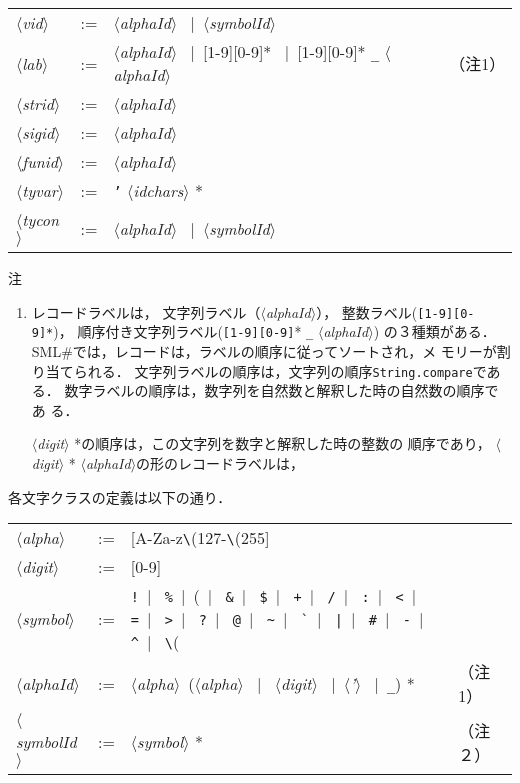 \documentclass{jbook}
\newcommand{\smlsharp}{SML\#}
\newcommand{\code}[1]{\mbox{\large\tt #1}}
\newcommand{\vbar}{\mbox{\ $|$\ }}
\newcommand{\nonterm}[1]{\mbox{$\langle$}{\it #1}\mbox{$\rangle$}}
\newcommand{\term}[1]{\mbox{{\tt #1}}}
\begin{document}
\begin{description}
\begin{center}
\begin{tabular}{lcll}
\nonterm{vid} &:=& \nonterm{alphaId} \vbar \nonterm{symbolId}
\\
\nonterm{lab} &:=& \nonterm{alphaId} \vbar [1-9][0-9]* \vbar [1-9][0-9]* \term{\_} \nonterm{alphaId}
                 & （注1）
\\
\nonterm{strid} &:=& \nonterm{alphaId} 
\\
\nonterm{sigid} &:=& \nonterm{alphaId} 
\\
\nonterm{funid} &:=& \nonterm{alphaId} 
\\
\nonterm{tyvar} &:=& \term{'} \nonterm{idchars} *
\\
\nonterm{tycon} &:=& \nonterm{alphaId} \vbar \nonterm{symbolId}
\end{tabular}
\end{center}%
注
\begin{enumerate}
\item 
	レコードラベルは，
文字列ラベル（\nonterm{alphaId}），
整数ラベル(\term{[1-9][0-9]*})，
順序付き文字列ラベル(\term{[1-9][0-9]}* \code{\_} \nonterm{alphaId})
の３種類がある．
	\smlsharp{}では，レコードは，ラベルの順序に従ってソートされ，メ
モリーが割り当てられる．
	文字列ラベルの順序は，文字列の順序\code{String.compare}である．
	数字ラベルの順序は，数字列を自然数と解釈した時の自然数の順序であ
る．

	\nonterm{digit} *の順序は，この文字列を数字と解釈した時の整数の
順序であり，
\nonterm{digit} * \nonterm{alphaId}の形のレコードラベルは，

\end{enumerate}



	各文字クラスの定義は以下の通り．

\begin{center}
\begin{tabular}{lcll}
\nonterm{alpha} &:=& [A-Za-z\verb(\(127-\verb(\(255]\\
\nonterm{digit} &:=& [0-9]\\
\nonterm{symbol} &:=& 
\verb(!(\vbar{}
\verb(%(\vbar{}
\verb(&(\vbar{}
\verb($(\vbar{}
\verb(+(\vbar{}
\verb(/(\vbar{}
\verb(:(\vbar{}
\verb(<(\vbar{}
\verb(=(\vbar{}
\verb(>(\vbar{}
\verb(?(\vbar{}
\verb(@(\vbar{}
\verb(~(\vbar{}
\verb(`(\vbar{}
\verb(|(\vbar{}
\verb(#(\vbar{}
\verb(-(\vbar{}
\verb(^(\vbar{}
\verb(\(\
\\
\nonterm{alphaId} &:=& \nonterm{alpha}\ (\nonterm{alpha} \vbar
	\nonterm{digit} \vbar \nonterm{'} \vbar \term{\_}) * & （注1）
\\
\nonterm{symbolId} &:=& \nonterm{symbol} * & （注２）
\end{tabular}
\end{center}%


\end{description}
\end{document}
